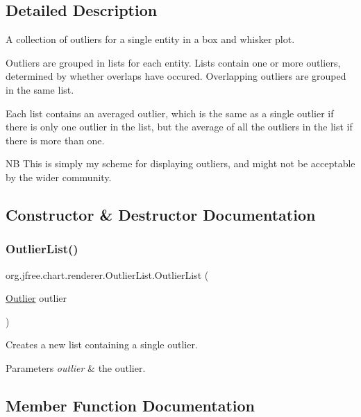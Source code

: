 \subsection{Detailed Description}
A collection of outliers for a single entity in a box and whisker plot.

Outliers are grouped in lists for each entity. Lists contain one or more outliers, determined by whether overlaps have occured. Overlapping outliers are grouped in the same list.

Each list contains an averaged outlier, which is the same as a single outlier if there is only one outlier in the list, but the average of all the outliers in the list if there is more than one.

NB This is simply my scheme for displaying outliers, and might not be acceptable by the wider community. 

\subsection{Constructor \& Destructor Documentation}
\mbox{\label{classorg_1_1jfree_1_1chart_1_1renderer_1_1_outlier_list_a595dce5346dc46d5efa84fbba235e157}} 
\subsubsection{\texorpdfstring{Outlier\+List()}{OutlierList()}}
{\footnotesize\ttfamily org.\+jfree.\+chart.\+renderer.\+Outlier\+List.\+Outlier\+List (\begin{DoxyParamCaption}\item[{\mbox{\hyperlink{classorg_1_1jfree_1_1chart_1_1renderer_1_1_outlier}{Outlier}}}]{outlier }\end{DoxyParamCaption})}

Creates a new list containing a single outlier.


\begin{DoxyParams}{Parameters}
{\em outlier} & the outlier. \\
\hline
\end{DoxyParams}


\subsection{Member Function Documentation}
\mbox{\label{classorg_1_1jfree_1_1chart_1_1renderer_1_1_outlier_list_a65bd496856ff8060a66cbe059294f07f}} 
